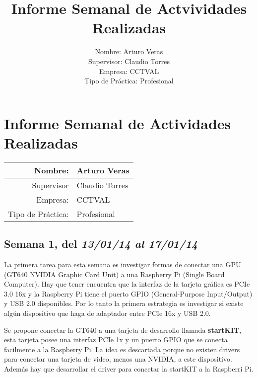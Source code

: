\documentclass[11pt,oneside,titlepage]{article}
\begin{document}
\title{Informe Semanal de Actvividades Realizadas}
\author{Nombre: Arturo Veras\\ 
	Supervisor: Claudio Torres\\
	Empresa: CCTVAL \\
Tipo de Práctica: Profesional}
%
\section*{Informe Semanal de Actividades Realizadas}
\begin{center}

\begin{tabular}{|r|l|}
\hline 
Nombre:  & Arturo Veras\\ 
\hline 
Supervisor & Claudio Torres \\ 
\hline 
Empresa: & CCTVAL \\ 
\hline 
Tipo de Práctica: & Profesional \\ 
\hline 
\end{tabular} 
\end{center}
\subsection*{Semana 1, del \textit{13/01/14 al 17/01/14}}
\begin{comment}
Tercera persona Él, Ella, Ello (del latín ille, illa, illud)
Se redacta en lenguaje formal y atemporal (no usar formas verbales en pasado simple)
Compró el periódico y se tomó un café.
\end{comment}

La primera tarea para esta semana es investigar formas de conectar una GPU (GT640 NVIDIA Graphic Card Unit) a una Raspberry Pi (Single Board Computer). Hay que tener encuentra que la interfaz de la tarjeta gr\'afica es PCIe 3.0 16x y la Raspberry Pi tiene el puerto GPIO (General-Purpose Input/Output) y USB 2.0 disponibles. Por lo tanto la primera estrategia es investigar si existe alg\'un dispositivo que haga de adaptador entre PCIe 16x y USB 2.0. 

Se propone conectar la GT640 a una tarjeta de desarrollo llamada \textbf{startKIT}, esta tarjeta posee una interfaz PCIe 1x y un puerto GPIO que se conecta facilmente a la Raspberry Pi. La idea es descartada porque no existen drivers para conectar una tarjeta de video, menos una NVIDIA, a este dispositivo. Además hay que desarrollar el driver para concetar la startKIT a la Raspberri Pi.
\end{document}

